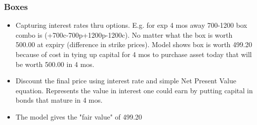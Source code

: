 \documentclass{article}
\begin{document}
\subsubsection{Boxes}
\begin{itemize}
    \item Capturing interest rates thru options. E.g. for exp 4 mos away
    700-1200 box combo is (+700c-700p+1200p-1200c). No matter what the box is
    worth 500.00 at expiry (difference in strike prices). Model shows box is
    worth 499.20 because of cost in tying up capital for 4 mos to purchase asset
    today that will be worth 500.00 in 4 mos.
    \item Discount the final price using interest rate and simple Net Present
    Value equation. Represents the value in interest one could earn by putting
    capital in bonds that mature in 4 mos.
    \item The model gives the "fair value" of 499.20
\end{itemize}
\end{document}
